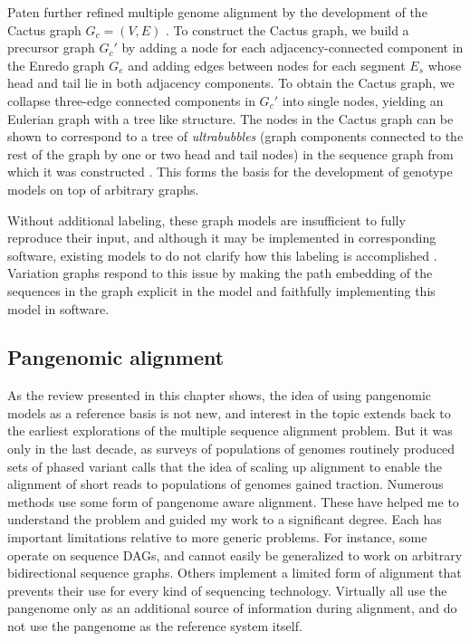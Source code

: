 Paten further refined multiple genome alignment by the development of the Cactus graph $G_c = (V,E)$ \cite{paten2011cactus}.
To construct the Cactus graph, we build a precursor graph $G_c'$ by adding a node for each adjacency-connected component in the Enredo graph $G_e$ and adding edges between nodes for each segment $E_s$ whose head and tail lie in both adjacency components.
To obtain the Cactus graph, we collapse three-edge connected components in $G_c'$ into single nodes, yielding an Eulerian graph with a tree like structure.
The nodes in the Cactus graph can be shown to correspond to a tree of \emph{ultrabubbles} (graph components connected to the rest of the graph by one or two head and tail nodes) in the sequence graph from which it was constructed \cite{paten2018superbubbles}.
This forms the basis for the development of genotype models on top of arbitrary graphs.

Without additional labeling, these graph models are insufficient to fully reproduce their input, and although it may be implemented in corresponding software, existing models to do not clarify how this labeling is accomplished \cite{kehr2014genome}.
Variation graphs respond to this issue by making the path embedding of the sequences in the graph explicit in the model and faithfully implementing this model in software.

\subsection{Pangenomic alignment}

As the review presented in this chapter shows, the idea of using pangenomic models as a reference basis is not new, and interest in the topic extends back to the earliest explorations of the multiple sequence alignment problem.
But it was only in the last decade, as surveys of populations of genomes routinely produced sets of phased variant calls \cite{liti2009population,weigel20091001,cao2011whole,1000Gphase1,1000g2015} that the idea of scaling up alignment to enable the alignment of short reads to populations of genomes gained traction.
Numerous methods use some form of pangenome aware alignment.
These have helped me to understand the problem and guided my work to a significant degree.
Each has important limitations relative to more generic problems.
For instance, some operate on sequence DAGs, and cannot easily be generalized to work on arbitrary bidirectional sequence graphs.
Others implement a limited form of alignment that prevents their use for every kind of sequencing technology.
Virtually all use the pangenome only as an additional source of information during alignment, and do not use the pangenome as the reference system itself.

